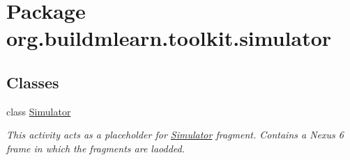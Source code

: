 \hypertarget{namespaceorg_1_1buildmlearn_1_1toolkit_1_1simulator}{}\section{Package org.\+buildmlearn.\+toolkit.\+simulator}
\label{namespaceorg_1_1buildmlearn_1_1toolkit_1_1simulator}
\subsection*{Classes}
\begin{DoxyCompactItemize}
\item 
class \hyperlink{classorg_1_1buildmlearn_1_1toolkit_1_1simulator_1_1Simulator}{Simulator}
\begin{DoxyCompactList}\small\item\em This activity acts as a placeholder for \hyperlink{classorg_1_1buildmlearn_1_1toolkit_1_1simulator_1_1Simulator}{Simulator} fragment. Contains a Nexus 6 frame in which the fragments are laodded. \end{DoxyCompactList}\end{DoxyCompactItemize}
